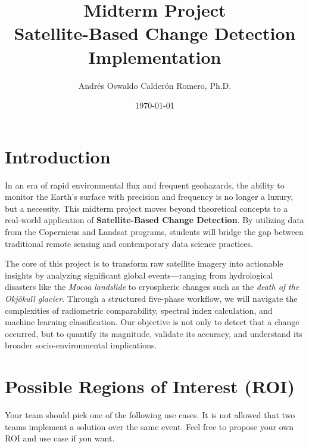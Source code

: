 \documentclass{article}
\title{Midterm Project \\ Satellite-Based Change Detection Implementation}
\author{Andrés Oswaldo Calderón Romero, Ph.D.}
\date{\today}
\begin{document}
\maketitle

\section{Introduction}
In an era of rapid environmental flux and frequent geohazards, the ability to monitor the Earth's surface with precision and frequency is no longer a luxury, but a necessity. This midterm project moves beyond theoretical concepts to a real-world application of \textbf{Satellite-Based Change Detection}. By utilizing data from the Copernicus and Landsat programs, students will bridge the gap between traditional remote sensing and contemporary data science practices.

The core of this project is to transform raw satellite imagery into actionable insights by analyzing significant global events—ranging from hydrological disasters like the \textit{Mocoa landslide} to cryospheric changes such as the \textit{death of the Okjökull glacier}. Through a structured five-phase workflow, we will navigate the complexities of radiometric comparability, spectral index calculation, and machine learning classification. Our objective is not only to detect that a change occurred, but to quantify its magnitude, validate its accuracy, and understand its broader socio-environmental implications.

\section{Possible Regions of Interest (ROI)}

Your team should pick one of the following use cases.  It is not allowed that two teams implement a solution over the same event.  Feel free to propose your own ROI and use case if you want.
\end{document}
